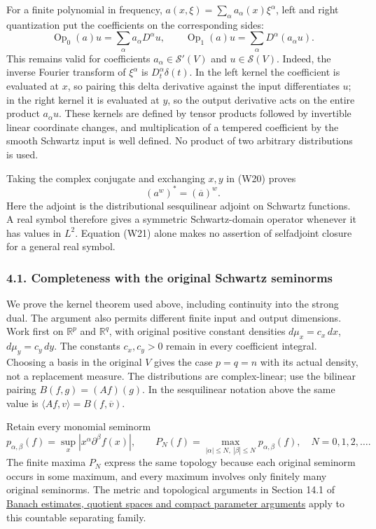 \documentclass[
  11pt,
]{article}
\begin{document}
For a finite polynomial in frequency,
\(a(x,\xi)=\sum_\alpha a_\alpha(x)\xi^\alpha\), left and right
quantization put the coefficients on the corresponding sides: \[
\operatorname{Op}_0(a)u=\sum_\alpha a_\alpha D^\alpha u,
\qquad
\operatorname{Op}_1(a)u=\sum_\alpha D^\alpha(a_\alpha u).
\] This remains valid for coefficients \(a_\alpha\in\mathcal S'(V)\) and
\(u\in\mathcal S(V)\). Indeed, the inverse Fourier transform of
\(\xi^\alpha\) is \(D_t^\alpha\delta(t)\). In the left kernel the
coefficient is evaluated at \(x\), so pairing this delta derivative
against the input differentiates \(u\); in the right kernel it is
evaluated at \(y\), so the output derivative acts on the entire product
\(a_\alpha u\). These kernels are defined by tensor products followed by
invertible linear coordinate changes, and multiplication of a tempered
coefficient by the smooth Schwartz input is well defined. No product of
two arbitrary distributions is used.

Taking the complex conjugate and exchanging \(x,y\) in (W20) proves \[
(a^w)^*=(\overline a)^w.
\tag{W21}
\] Here the adjoint is the distributional sesquilinear adjoint on
Schwartz functions. A real symbol therefore gives a symmetric
Schwartz-domain operator whenever it has values in \(L^2\). Equation
(W21) alone makes no assertion of selfadjoint closure for a general real
symbol.

\subsubsection{4.1. Completeness with the original Schwartz
seminorms}\label{completeness-with-the-original-schwartz-seminorms}

We prove the kernel theorem used above, including continuity into the
strong dual. The argument also permits different finite input and output
dimensions. Work first on \(\mathbb R^p\) and \(\mathbb R^q\), with
original positive constant densities \(d\mu_x=c_x\,dx\),
\(d\mu_y=c_y\,dy\). The constants \(c_x,c_y>0\) remain in every
coefficient integral. Choosing a basis in the original \(V\) gives the
case \(p=q=n\) with its actual density, not a replacement measure. The
distributions are complex-linear; use the bilinear pairing
\(B(f,g)=(Af)(g)\). In the sesquilinear notation above the same value is
\(\langle Af,v\rangle=B(f,\overline v)\).

Retain every monomial seminorm \[
 p_{\alpha,\beta}(f)=\sup_x|x^\alpha\partial^\beta f(x)|,
 \qquad
 P_N(f)=\max_{|\alpha|\leq N,\ |\beta|\leq N}p_{\alpha,\beta}(f),
 \quad N=0,1,2,\ldots .
 \tag{WK1}
\] The finite maxima \(P_N\) express the same topology because each
original seminorm occurs in some maximum, and every maximum involves
only finitely many original seminorms. The metric and topological
arguments in Section 14.1 of \href{banach-foundation-bridges.pdf}{Banach
estimates, quotient spaces and compact parameter arguments} apply to
this countable separating family.
\end{document}
